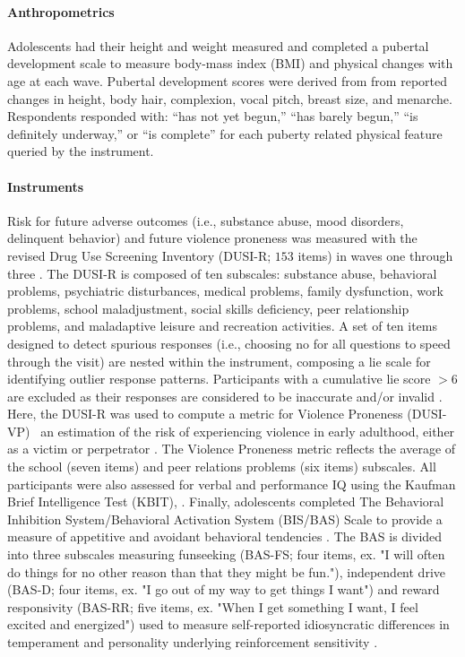 \documentclass{article}%
\begin{document}
\paragraph*{Anthropometrics} Adolescents had their height and weight measured and completed a pubertal development scale \citep{carskadon1993self} to measure body-mass index (BMI) and physical changes with age at each wave. Pubertal development scores were derived from from reported changes in height, body hair, complexion, vocal pitch, breast size, and menarche. Respondents responded with: “has not yet begun,” “has barely begun,” “is definitely underway,” or “is complete” for each puberty related physical feature queried by the instrument. 
\paragraph*{Instruments} Risk for future adverse outcomes (i.e., substance abuse, mood disorders, delinquent behavior) and future violence proneness was measured with the revised Drug Use Screening Inventory (DUSI-R; $153$ items) in waves one through three \citep{tarter1994reliability}. The DUSI-R is composed of ten subscales: substance abuse, behavioral problems, psychiatric disturbances, medical problems, family dysfunction, work problems, school maladjustment, social skills deficiency, peer relationship problems, and maladaptive leisure and recreation activities. A set of ten items designed to detect spurious responses (i.e., choosing no for all questions to speed through the visit) are nested within the instrument, composing a lie scale for identifying outlier response patterns. Participants with a cumulative lie score $>6$ are excluded as their responses are considered to be inaccurate and/or invalid \citep{dalla2003effects}. Here, the DUSI-R was used to compute a metric for Violence Proneness (DUSI-VP) \textemdash \ an estimation of the risk of experiencing violence in early adulthood, either as a victim or perpetrator \citep{kirisci2009violence}. The Violence Proneness metric reflects the average of the school (seven items) and peer relations problems (six items) subscales. All participants were also assessed for verbal and performance IQ using the Kaufman Brief Intelligence Test (KBIT), \citep{kaufman2004kaufman}. Finally, adolescents completed The Behavioral Inhibition System/Behavioral Activation System (BIS/BAS) Scale  to provide a measure of appetitive and avoidant behavioral tendencies \citep{carver1994behavioral}. The BAS is divided into three subscales measuring funseeking (BAS-FS; four items, ex. "I will often do things for no other reason than that they might be fun."), independent drive (BAS-D; four items, ex. "I go out of my way to get things I want") and reward responsivity (BAS-RR; five items, ex. "When I get something I want, I feel excited and energized") used to measure self-reported idiosyncratic differences in temperament and personality underlying reinforcement sensitivity \citep{corr2004reinforcementsensitivity}.
\end{document}
